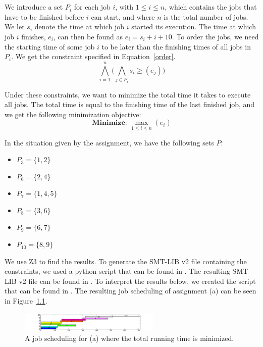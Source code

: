 \chapter{}\label{chp:3}
We introduce a set $P_i$ for each job $i$, with $1 \leq i \leq n$, which contains the jobs that have to be finished before $i$ can start, and where $n$ is the total number of jobs. We let $s_i$ denote the time at which job $i$ started its execution. The time at which job $i$ finishes, $e_i$, can then be found as $e_i = s_i + i + 10$. To order the jobs, we need the starting time of some job $i$ to be later than the finishing times of all jobs in $P_i$. We get the constraint specified in Equation~\ref{order}.
\begin{equation}
    \label{order}
    \bigwedge^{n}_{i=1}\big(\bigwedge_{j\in P_i} s_i \geq (e_j)\big)
\end{equation}

Under these constraints, we want to minimize the total time it takes to execute all jobs. The total time is equal to the finishing time of the last finished job, and we get the following minimization objective:
\begin{equation}
    \textbf{Minimize: }\max_{1\leq i \leq n}(e_i)
\end{equation}

In the situation given by the assignment, we have the following sets $P$:
\begin{itemize}
    \item $P_3 = \{1,2\}$
    \item $P_6 = \{2,4\}$
    \item $P_7 = \{1,4,5\}$
    \item $P_8 = \{3,6\}$
    \item $P_9 = \{6,7\}$
    \item $P_{10} = \{8,9\}$
\end{itemize}
We use Z3 to find the results. To generate the SMT-LIB v2 file containing the constraints, we used a python script that can be found in . The resulting SMT-LIB v2 file can be found in . To interpret the results below, we created the script that can be found in . The resulting job scheduling of assignment (a) can be seen in Figure~\ref{fig:3a}.
\begin{figure}[H]
    \centering
    \hspace*{-1cm}
    \includegraphics[width=0.6\textwidth]{3/a.pdf}
    \caption{A job scheduling for (a) where the total running time is minimized.}
    \label{fig:3a}
\end{figure}


